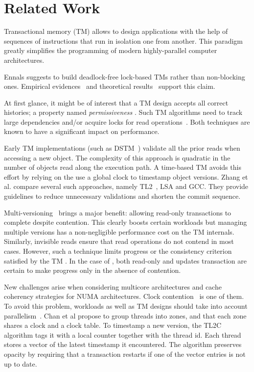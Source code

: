 \section{Related Work}

Transactional memory (TM) allows to design applications with the help of sequences of instructions that run in isolation one from another.
This paradigm greatly simplifies the programming of modern highly-parallel computer architectures.

Ennals \cite{emals} suggests to build deadlock-free lock-based TMs rather than non-blocking ones.
Empirical evidences~\cite{dice06} and theoretical results~\cite{Guerraoui:2008,KuznetsovR15} support this claim.

At first glance, it might be of interest that a TM design accepts all correct histories; a property named \emph{permissiveness} \cite{guerraoui08}.
Such TM algorithms need to track large dependencies \cite{Keidar:2009} and/or acquire locks for read operations~\cite{attiya2012single}.
Both techniques are known to have a significant impact on performance.

Early TM implementations (such as DSTM~\cite{herlihy2003software}) validate all the prior reads when accessing a new object.
The complexity of this approach is quadratic in the number of objects read along the execution path.
A time-based TM avoids this effort by relying on the use a global clock to timestamp object versions.
Zhang et al. \cite{zhang2008commit} compare several such approaches, namely TL2~\cite{dice2006transactional}, LSA \cite{riegel2006lazy} and GCC\cite{spear2006conflict}.
They provide guidelines to reduce unnecessary validations and shorten the commit sequence.

Multi-versioning~\cite{Fernandes:2011, Diegues:2014} brings a major benefit: allowing read-only transactions to complete despite contention.
This clearly boosts certain workloads but managing multiple versions has a non-negligible performance cost on the TM internals.
Similarly, invisible reads ensure that read operations do not contend in most cases.
However, such a technique limits progress or the consistency criterion satisfied by the TM \cite{Attiya:2009}.
In the case of , both read-only and updates transaction are certain to make progress only in the absence of contention.

New challenges arise when considering multicore architectures and cache coherency strategies for NUMA architectures.
Clock contention~\cite{6121290} is one of them.
To avoid this problem, workloads as well as TM designs should take into account parallelism~\cite{Nguyen:2017}.
Chan et al \cite{6121290} propose to group threads into zones, and that each zone shares a clock and a clock table.
To timestamp a new version, the TL2C algorithm \cite{Avni:2008} tags it with a local counter together with the thread id.
Each thread stores a vector of the latest timestamp it encountered.
The algorithm preserves opacity by requiring that a transaction restarts if one of the vector entries is not up to date.

